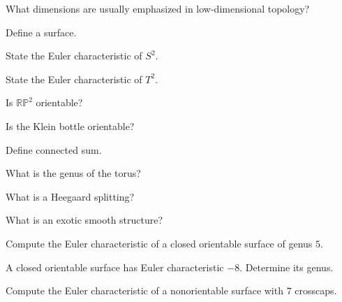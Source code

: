 \begin{exercise}[1]
What dimensions are usually emphasized in low-dimensional topology?
\end{exercise}

\begin{exercise}[1]
Define a surface.
\end{exercise}

\begin{exercise}[1]
State the Euler characteristic of \(S^2\).
\end{exercise}

\begin{exercise}[1]
State the Euler characteristic of \(T^2\).
\end{exercise}

\begin{exercise}[1]
Is \(\mathbb{RP}^2\) orientable?
\end{exercise}

\begin{exercise}[1]
Is the Klein bottle orientable?
\end{exercise}

\begin{exercise}[1]
Define connected sum.
\end{exercise}

\begin{exercise}[1]
What is the genus of the torus?
\end{exercise}

\begin{exercise}[1]
What is a Heegaard splitting?
\end{exercise}

\begin{exercise}[1]
What is an exotic smooth structure?
\end{exercise}

\begin{exercise}[2]
Compute the Euler characteristic of a closed orientable surface of genus
\(5\).
\end{exercise}

\begin{exercise}[2]
A closed orientable surface has Euler characteristic \(-8\). Determine its
genus.
\end{exercise}

\begin{exercise}[2]
Compute the Euler characteristic of a nonorientable surface with \(7\)
crosscaps.
\end{exercise}

